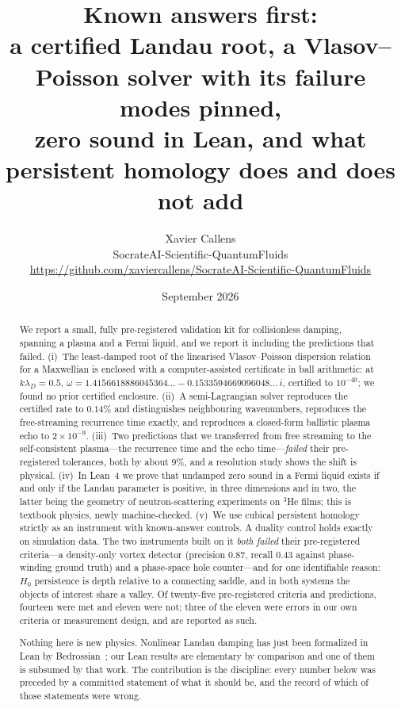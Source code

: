 \documentclass[11pt,a4paper]{article}
\title{\textbf{Known answers first:}\\
\large a certified Landau root, a Vlasov--Poisson solver with its failure modes pinned,\\
zero sound in Lean, and what persistent homology does and does not add}
\author{Xavier Callens\\
\small SocrateAI-Scientific-QuantumFluids\\
\small \url{https://github.com/xaviercallens/SocrateAI-Scientific-QuantumFluids}}
\date{September 2026}
\begin{document}
\maketitle

\begin{abstract}
\noindent
We report a small, fully pre-registered validation kit for collisionless damping, spanning a plasma and
a Fermi liquid, and we report it including the predictions that failed. (i)~The least-damped root of the
linearised Vlasov--Poisson dispersion relation for a Maxwellian is enclosed with a computer-assisted
certificate in ball arithmetic: at $k\lambda_D=0.5$,
$\omega = 1.4156618886045364\ldots - 0.1533594669096048\ldots\,i$, certified to $10^{-40}$; we found no
prior certified enclosure. (ii)~A semi-Lagrangian solver reproduces the certified rate to $0.14\%$ and
distinguishes neighbouring wavenumbers, reproduces the free-streaming recurrence time exactly, and
reproduces a closed-form ballistic plasma echo to $2\times10^{-9}$. (iii)~Two predictions that we
transferred from free streaming to the self-consistent plasma---the recurrence time and the echo
time---\emph{failed} their pre-registered tolerances, both by about $9\%$, and a resolution study shows
the shift is physical. (iv)~In Lean~4 we prove that undamped zero sound in a Fermi liquid exists if and
only if the Landau parameter is positive, in three dimensions and in two, the latter being the geometry
of neutron-scattering experiments on $^3$He films; this is textbook physics, newly machine-checked.
(v)~We use cubical persistent homology strictly as an instrument with known-answer controls. A
duality control holds exactly on simulation data. The two instruments built on it \emph{both failed}
their pre-registered criteria---a density-only vortex detector (precision $0.87$, recall $0.43$ against
phase-winding ground truth) and a phase-space hole counter---and for one identifiable reason: $H_0$
persistence is depth relative to a connecting saddle, and in both systems the objects of interest share
a valley. Of twenty-five pre-registered criteria and predictions, fourteen were met and eleven were not; three
of the eleven were errors in our own criteria or measurement design, and are reported as such.

Nothing here is new physics. Nonlinear Landau damping has just been formalized in Lean by
Bedrossian~\cite{Bedrossian2026}; our Lean results are elementary by comparison and one of them is
subsumed by that work. The contribution is the discipline: every number below was preceded by a
committed statement of what it should be, and the record of which of those statements were wrong.
\end{abstract}
\end{document}
